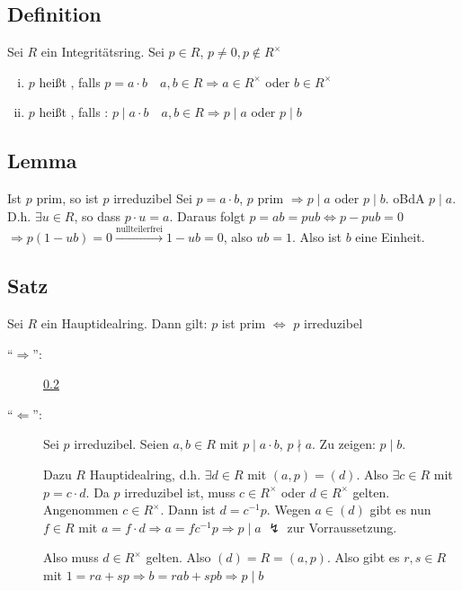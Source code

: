 \subsection[Definition von irreduzibel und prim in Integritätsringen]{Definition} %
\label{sub:912}
Sei $R$ ein Integritätsring. Sei $p \in R$, $p \not= 0, p \not\in R^\times$
\begin{enumerate}[(i)]
	\item $p$ heißt , falls $p=a \cdot b \quad  a,b \in R \Rightarrow a \in R^\times$ oder $b \in R^\times$
	\item $p$ heißt , falls : $p \mid a \cdot b  \quad  a,b \in R \Rightarrow p \mid a$ oder $p \mid b$ 
\end{enumerate}

\subsection[Lemma: prim impliziert irreduzibel]{Lemma} %
\label{sub:913}
Ist $p$ prim, so ist $p$ irreduzibel
Sei $p =a \cdot b$, $p$ prim $\Rightarrow p \mid a$ oder $p \mid b$. oBdA $p \mid a$. D.h. $\exists u \in R$, so dass $p \cdot u = a$. Daraus folgt $p=ab=pub \Leftrightarrow p - pub = 0$
$\Rightarrow p(1- ub) = 0 \xrightarrow{\text{nullteilerfrei}}  1- ub = 0$, also $ub = 1$. Also ist $b$ eine Einheit. \bewende

\subsection[Satz: In Hauptidealringen ist prim äquivalent zu irreduzibel]{Satz} %
\label{sub:914}
Sei $R$ ein Hauptidealring. Dann gilt: $p$ ist prim $\iff$ $p$ irreduzibel
\begin{description}
	\item[\enquote{$\Rightarrow$}:] \ref{sub:913}
	\item[\enquote{$\Leftarrow$}:] Sei $p$ irreduzibel. Seien $a,b \in R$ mit $p \mid a \cdot b$, $p \nmid a$. Zu zeigen: $p \mid b$.
	
	Dazu $R$ Hauptidealring, d.h. $\exists d \in R$ mit $(a,p)= (d)$. Also $\exists c \in R$ mit $p=c \cdot d$. Da $p$ irreduzibel ist, muss $c \in R^\times$ oder 
	$d \in R^\times$ gelten. Angenommen $c \in R^\times$. Dann ist $d= c ^{-1} p$. Wegen $a \in (d)$ gibt es nun $f \in R$ mit $a= f \cdot d \Rightarrow a = f c ^{-1} p \Rightarrow p \mid a $ {\large $\lightning$} zur Vorraussetzung. 
	
	Also muss $d \in R^\times$ gelten. Also $(d)= R= (a,p)$. Also gibt es $r,s \in R$ mit $1= ra + sp \Rightarrow b = rab + spb \Rightarrow p \mid b$ \bewende
\end{description}

